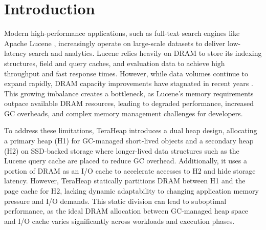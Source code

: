 \section{Introduction}

%
Modern high-performance applications, such as full-text search engines like
Apache Lucene \cite{lucene_dimitris}, increasingly operate on large-scale
datasets to deliver low-latency search and  analytics. Lucene relies heavily on
DRAM to store its indexing structures, field and query caches, and evaluation
data to achieve high throughput and fast response times. However, while data
volumes continue to expand rapidly, DRAM capacity improvements have stagnated in
recent years \cite{DAOS, Borg}. This growing imbalance creates a bottleneck, as
Lucene’s memory requirements outpace available DRAM resources, leading to
degraded performance, increased GC overheads, and complex memory management
challenges for developers.

To address these limitations, TeraHeap \cite{TeraHeap} introduces a dual heap
design, allocating a primary heap (H1) for GC-managed short-lived objects and a
secondary heap (H2) on SSD-backed storage where longer-lived data structures
such as the Lucene query cache are placed to reduce GC overhead. Additionally,
it uses a portion of DRAM as an I/O cache to accelerate accesses to H2 and hide
 storage latency. However,
TeraHeap statically partitions DRAM between H1 and the page cache for H2,
lacking dynamic adaptability to changing application memory pressure and I/O
demands. This static division can lead to suboptimal performance, as the ideal
DRAM allocation between GC-managed heap space and I/O cache varies significantly
across workloads and execution phases.

